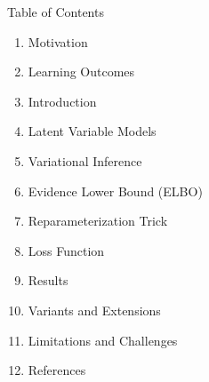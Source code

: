 \begin{frame}[allowframebreaks]{Table of Contents}
\begin{enumerate}
    \setlength{\itemsep}{-0.2em}
    \item Motivation
    \item Learning Outcomes
    \item Introduction
    \item Latent Variable Models
    \item Variational Inference
    \item Evidence Lower Bound (ELBO)
    \item Reparameterization Trick
    \item Loss Function
    \item Results
    \item Variants and Extensions
    \item Limitations and Challenges
    \item References
\end{enumerate}
\end{frame}